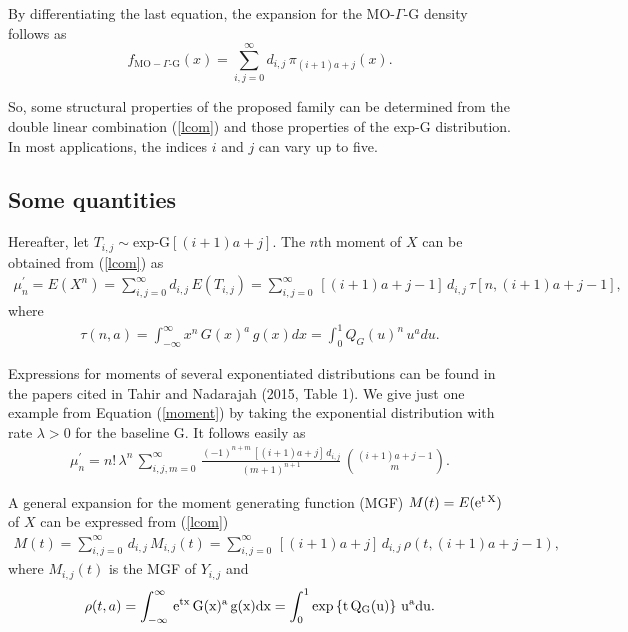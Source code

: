 \documentclass[twoside,leqno,11pt]{article}
\begin{document}
By differentiating the last equation, the expansion for the MO-$\Gamma$-G density follows as
\begin{equation}\label{lcom}
f_{\text{MO}-\Gamma\text{-G}}(x)=\sum_{i,j=0}^\infty d_{i,j}\,\pi_{(i+1)a+j}(x).
\end{equation}

So, some structural properties of the proposed family can be determined from the double linear combination (\ref{lcom})
and those properties of the exp-G distribution. In most applications, the indices $i$ and $j$ can vary up to five.


\subsection{Some quantities}

Hereafter, let $T_{i,j}\sim$exp-G$[(i+1)a+j]$. The $n$th moment of $X$ can be obtained from (\ref{lcom}) as
\begin{eqnarray}\label{moment}
\displaystyle
\mu_n^{\prime}=E(X^n)=\sum_{i,j=0}^\infty d_{i,j}\,E(T_{i,j})=\sum_{i,j=0}^\infty \,[(i+1)a+j-1]\,d_{i,j}\,\tau[n,(i+1)a+j-1],
\end{eqnarray}
where
\begin{eqnarray*}
\tau(n,a)=\int_{-\infty}^{\infty} x^n\,G(x)^{a}\,g(x)dx=\int_{0}^{1} Q_G(u)^n\,u^a d u.
\end{eqnarray*}

Expressions for moments of several exponentiated distributions can be found in the papers
cited in Tahir and Nadarajah (2015, Table 1). We give just one example from Equation (\ref{moment})
by taking the exponential distribution with rate $\lambda>0$ for the baseline G.
It follows easily as
\begin{eqnarray*}
\mu_n^{\prime}= n!\,\lambda^n\,\sum_{i,j,m=0}^\infty \,\frac{(-1)^{n+m}\,[(i+1)a+j]\,d_{i,j}}{(m+1)^{n+1}}\,\binom{(i+1)a+j-1}{m}.
\end{eqnarray*}

A general expansion for the moment generating function (MGF) $M(t)=E(\rm{e}^{t\,X})$ of $X$ can be expressed from (\ref{lcom})
\begin{eqnarray}\label{mgf}
\displaystyle
M(t)=\sum_{i,j=0}^{\infty} \,d_{i,j}\,M_{i,j}(t)=\sum_{i,j=0}^{\infty}\, [(i+1)a+j]\,d_{i,j}\,\rho(t,(i+1)a+j-1),
\end{eqnarray}
where $M_{i,j}(t)$ is the MGF of $Y_{i,j}$ and
\begin{eqnarray*}
\rho(t,a)=\int_{-\infty}^{\infty}\,\rm{e}^{t x}\,G(x)^{a}\,g(x) dx=\int_{0}^{1}\exp\left\{t\,Q_G(u)\right\}\,u^a d u.
\end{eqnarray*}
\end{document}
